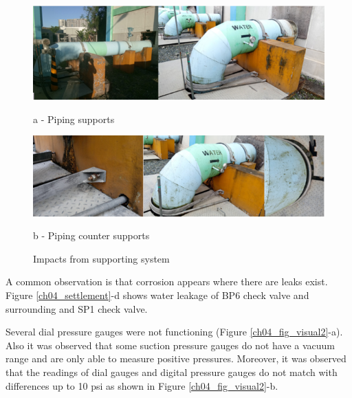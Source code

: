 \begin{figure}[!htb]
	\begin{minipage}[b]{0.5\linewidth}
		\centering
		\includegraphics[width=\textwidth]{figures/ch04_fig_visual01}
		\caption*{a - Piping supports}
	\end{minipage}
	\hspace{0.05cm}
	\begin{minipage}[b]{0.5\linewidth}
		\centering
		\includegraphics[width=\textwidth]{figures/ch04_fig_visual02}
		\caption*{b - Piping counter supports}
	\end{minipage}
	\caption{Impacts from supporting system}
	\label{ch04_fig_visual1}
\end{figure}

A common observation is that corrosion appears where there are leaks exist. Figure \ref{ch04_settlement}-d shows water leakage of BP6 check valve and surrounding and SP1 check valve.

Several dial pressure gauges were not functioning (Figure \ref{ch04_fig_visual2}-a). Also it was observed that some suction pressure gauges do not have a vacuum range and are only able to measure positive pressures.  Moreover, it was observed that the readings of dial gauges and digital pressure gauges do not match with differences up to 10 psi as shown in Figure \ref{ch04_fig_visual2}-b.


